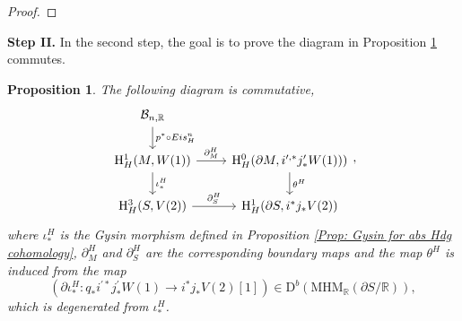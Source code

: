 \documentclass[11pt, a4paper]{amsart}
\theoremstyle{plain}
\newtheorem{proposition}[theorem]{Proposition}
\theoremstyle{definition}
\numberwithin{equation}{section}
\def\RR{\mathbb{R}}
\begin{document}
\begin{proof}
\end{proof}

\vspace{10pt}

\noindent \textbf{Step II.} In the second step, the goal is to prove the diagram in Proposition \ref{Prop: Hodge commutative diagram} commutes. 

\begin{proposition}
\label{Prop: Hodge commutative diagram}
The following diagram is commutative,
\[
    \begin{tikzcd}
         \mathcal{B}_{n, \RR} \ar[d, "p^{*}\circ Eis_{H}^{n}"] & \\
        \mathrm{H}^{1}_{H}(M,W(1)) \ar[r, "\partial_{M}^{H}"] \ar[d, "{\iota_{*}^{H}}"] & \mathrm{H}^{0}_{H}(\partial{M}, i^{\prime, *}j^{\prime}_{*}W(1))) \ar[d, "{\theta^{H}}"] \\
        \mathrm{H}^{3}_{H}(S, V(2)) \ar[r, "\partial_{S}^{H}"] & \mathrm{H}^{1}_{H}(\partial{S}, i^{*}j_{*}V(2))
    \end{tikzcd}, 
\]
where $\iota_{*}^{H}$ is the Gysin morphism defined in Proposition \ref{Prop: Gysin for abs Hdg cohomology}, $\partial_{M}^{H}$ and $\partial_{S}^{H}$ are the corresponding boundary maps and the map $\theta^{H}$ is induced from the map
\begin{equation}
    (\partial \iota_{*}^{H} \colon q_{*}i^{\prime*}j^{\prime}_{*}W(1) \rightarrow i^{*}j_{*}V(2)[1]) \in \mathrm{D}^{b}(\mathrm{MHM}_{\RR}(\partial S/\RR)),
\end{equation}
which is degenerated from $\iota^{H}_{*}$. 
    
\end{proposition}
\end{document}
